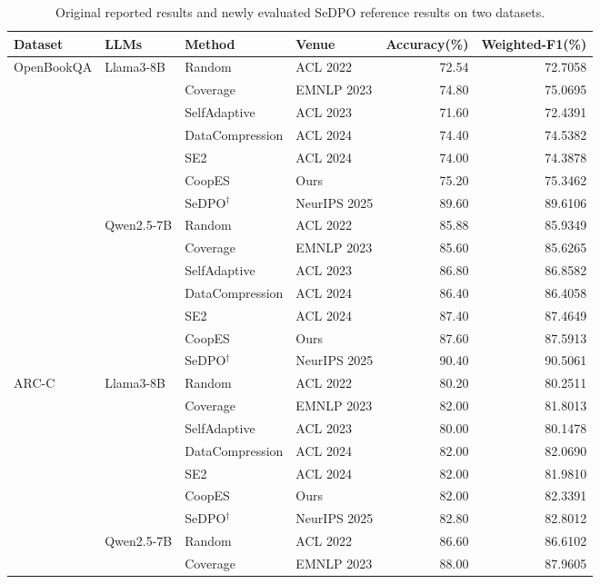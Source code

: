 \begin{table}[t]
\centering
\caption{Original reported results and newly evaluated SeDPO reference results on two datasets.}
\label{tab:sedpo_reference}
\begin{tabular}{llllrr}
\toprule
Dataset & LLMs & Method & Venue & Accuracy(\%) & Weighted-F1(\%) \\
\midrule
\multirow{14}{*}{OpenBookQA} & \multirow{7}{*}{Llama3-8B} & Random & ACL 2022 & 72.54 & 72.7058 \\
 &  & Coverage & EMNLP 2023 & 74.80 & 75.0695 \\
 &  & SelfAdaptive & ACL 2023 & 71.60 & 72.4391 \\
 &  & DataCompression & ACL 2024 & 74.40 & 74.5382 \\
 &  & SE2 & ACL 2024 & 74.00 & 74.3878 \\
 &  & CoopES & Ours & 75.20 & 75.3462 \\
 & & SeDPO$^{\dagger}$ & NeurIPS 2025 & 89.60 & 89.6106 \\
\cmidrule(lr){2-6}
 & \multirow{7}{*}{Qwen2.5-7B} & Random & ACL 2022 & 85.88 & 85.9349 \\
 &  & Coverage & EMNLP 2023 & 85.60 & 85.6265 \\
 &  & SelfAdaptive & ACL 2023 & 86.80 & 86.8582 \\
 &  & DataCompression & ACL 2024 & 86.40 & 86.4058 \\
 &  & SE2 & ACL 2024 & 87.40 & 87.4649 \\
 &  & CoopES & Ours & 87.60 & 87.5913 \\
 & & SeDPO$^{\dagger}$ & NeurIPS 2025 & 90.40 & 90.5061 \\
\midrule
\multirow{14}{*}{ARC-C} & \multirow{7}{*}{Llama3-8B} & Random & ACL 2022 & 80.20 & 80.2511 \\
 &  & Coverage & EMNLP 2023 & 82.00 & 81.8013 \\
 &  & SelfAdaptive & ACL 2023 & 80.00 & 80.1478 \\
 &  & DataCompression & ACL 2024 & 82.00 & 82.0690 \\
 &  & SE2 & ACL 2024 & 82.00 & 81.9810 \\
 &  & CoopES & Ours & 82.00 & 82.3391 \\
 & & SeDPO$^{\dagger}$ & NeurIPS 2025 & 82.80 & 82.8012 \\
\cmidrule(lr){2-6}
 & \multirow{7}{*}{Qwen2.5-7B} & Random & ACL 2022 & 86.60 & 86.6102 \\
 &  & Coverage & EMNLP 2023 & 88.00 & 87.9605 \\

\end{tabular}
\end{table}
